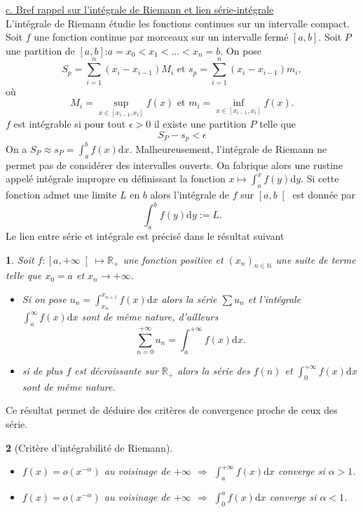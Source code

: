 \documentclass[8pt,notheorems]{beamer}
\def \N{\mathbb N}
\newtheorem{prop}{\translate{Proposition}}
\theoremstyle{definition}
\theoremstyle{example}
\theoremstyle{mystyle}
\theoremstyle{plain}
\begin{document}
\begin{frame}[allowframebreaks]
\underline{c. Bref rappel sur l'intégrale de Riemann et lien série-intégrale}\\
L'intégrale de Riemann étudie les fonctions continues sur un intervalle compact. Soit $f$ une fonction continue par morceaux sur un intervalle fermé $[a,b]$. Soit $P$ une partition de $[a,b]$:$a = x_0 <x_1<\ldots<x_n = b$. On pose
$$
S_p = \sum_{i = 1}^{n}(x_i-x_{i-1})M_i\text{ et }s_p = \sum_{i = 1}^{n}(x_i-x_{i-1})m_i,
$$
où
$$
M_i= \underset{x\in [x_{i-1}, x_{i}]}{\sup} f(x)\text{ et }m_i= \underset{x\in [x_{i-1}, x_{i}]}{\inf} f(x).
$$
$f$ est intégrable si pour tout $\epsilon >0$ il existe une partition $P$ telle que 
$$
S_P-s_p<\epsilon
$$
On a $S_P\approx s_P=\int_a^{b}f(x)\text{d}x$. Malheureusement, l'intégrale de Riemann ne permet pas de considérer des intervalles ouverts. On fabrique alors une rustine appelé intégrale impropre en définissant la fonction $x\mapsto \int_{a}^{x}f(y)\text{d}y$. Si cette fonction admet une limite $L$ en $b$ alors l'intégrale de $f$ sur $\left[a,b\right[$ est donnée par 
$$
\int_{a}^{b}f(y)\text{d}y := L.
$$
Le lien entre série et intégrale est précisé dans le résultat suivant 
\begin{prop}
Soit $f:\left[a,+\infty\right[\mapsto \mathbb{R}_+$ une fonction positive et $(x_n)_{n\in\N}$ une suite de terme telle que $x_0 = a$ et $x_n\rightarrow +\infty$.
\begin{itemize}
    \item Si on pose $u_n = \int_{x_n}^{x_{n+1}}f(x)\text{d}x$ alors la série $\sum u_n$ et l'intégrale $\int_a^{\infty}f(x)\text{d}x$ sont de même nature, d'ailleurs 
    $$
    \sum_{n=0}^{+\infty}u_n = \int_a^{+\infty}f(x)\text{d}x.
    $$
    \item si de plus $f$ est décroissante sur $\mathbb{R}_+$ alors la série des $f(n)$ et $\int_0^{+\infty}f(x)\text{d}x$ sont de même nature.  
\end{itemize}
\end{prop}
Ce résultat permet de déduire des critères de convergence proche de ceux des série. 
\begin{prop}[Critère d'intégrabilité de Riemann]

\begin{itemize}
    \item $f(x)=o(x^{-\alpha})$ au voisinage de $+\infty$ $\Rightarrow$ $\int_a^{+\infty} f(x)\text{d}x$ converge si $\alpha >1$.
    \item $f(x)=o(x^{-\alpha})$ au voisinage de $+\infty$ $\Rightarrow$ $\int_0^{a} f(x)\text{d}x$ converge si $\alpha <1$.
\end{itemize}
\end{prop} 
\end{frame}
\end{document}
